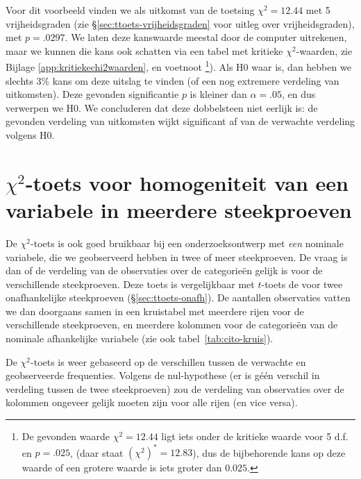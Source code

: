 \documentclass[
]{book}
\begin{document}
Voor dit voorbeeld vinden we als uitkomst van de toetsing \(\chi^2=12.44\)
met 5 vrijheidsgraden (zie
§\ref{sec:ttoets-vrijheidsgraden} voor uitleg over
vrijheidsgraden), met \(p=.0297\). We laten deze kanswaarde meestal door de
computer uitrekenen, maar we kunnen die kans ook schatten via een tabel met kritieke \(\chi^2\)-waarden, zie Bijlage \ref{app:kritiekechi2waarden}, en voetnoot \footnote{De gevonden waarde \(\chi^2=12.44\) ligt iets onder de kritieke waarde voor 5 d.f. en \(p=.025\), (daar staat \((\chi^2)^*=12.83\)), dus de bijbehorende kans op deze waarde of een grotere waarde is iets groter dan \(0.025\).}).
Als H0 waar is, dan hebben we slechts 3\% kans om
deze uitslag te vinden (of een nog extremere verdeling van uitkomsten).
Deze gevonden significantie \(p\) is kleiner dan \(\alpha=.05\), en dus
verwerpen we H0. We concluderen dat deze dobbelsteen niet eerlijk is: de
gevonden verdeling van uitkomsten wijkt significant af van de verwachte
verdeling volgens H0.

\hypertarget{chi2-toets-voor-homogeniteit-van-een-variabele-in-meerdere-steekproeven}{%
\section{\texorpdfstring{\(\chi^2\)-toets voor homogeniteit van een variabele in meerdere steekproeven}{\textbackslash chi\^{}2-toets voor homogeniteit van een variabele in meerdere steekproeven}}\label{chi2-toets-voor-homogeniteit-van-een-variabele-in-meerdere-steekproeven}}

De \(\chi^2\)-toets is ook goed bruikbaar bij een onderzoeksontwerp met \emph{een} nominale
variabele, die we geobserveerd hebben in twee of meer steekproeven. De
vraag is dan of de verdeling van de observaties over de categorieën
gelijk is voor de verschillende steekproeven. Deze toets is
vergelijkbaar met \(t\)-toets de voor twee onafhankelijke steekproeven
(§\ref{sec:ttoets-onafh}). De aantallen observaties vatten we dan
doorgaans samen in een kruistabel met meerdere rijen voor de
verschillende steekproeven, en meerdere kolommen voor de categorieën van
de nominale afhankelijke variabele (zie ook
tabel~\ref{tab:cito-kruis}).

De \(\chi^2\)-toets is weer gebaseerd op de verschillen tussen de verwachte en
geobserveerde frequenties. Volgens de nul-hypothese (er is géén verschil
in verdeling tussen de twee steekproeven) zou de verdeling van
observaties over de kolommen ongeveer gelijk moeten zijn voor alle rijen
(en vice versa).
\end{document}
